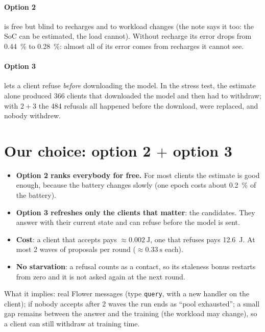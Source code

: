 \documentclass[11pt,a4paper]{article}
\begin{document}
\paragraph{Option 2} is free but blind to recharges and to workload changes
(the note says it too: the SoC can be estimated, the load cannot). Without
recharge its error drops from \SI{0.44}{\percent} to \SI{0.28}{\percent}: almost
all of its error comes from recharges it cannot see.

\paragraph{Option 3} lets a client refuse \emph{before} downloading the model.
In the stress test, the estimate alone produced 366 clients that downloaded the
model and then had to withdraw; with $2+3$ the 484 refusals all happened before
the download, were replaced, and nobody withdrew.

\section{Our choice: option 2 $+$ option 3}

\begin{itemize}
  \item \textbf{Option 2 ranks everybody for free.} For most clients the
        estimate is good enough, because the battery changes slowly (one
        epoch costs about \SI{0.2}{\percent} of the battery).
  \item \textbf{Option 3 refreshes only the clients that matter}: the
        candidates. They answer with their current state and can refuse
        before the model is sent.
  \item \textbf{Cost}: a client that accepts pays $\approx\SI{0.002}{\joule}$, one
        that refuses pays \SI{12.6}{\joule}. At most 2 waves of proposals per
        round ($\approx\SI{0.33}{\second}$ each).
  \item \textbf{No starvation}: a refusal counts as a contact, so its
        staleness bonus restarts from zero and it is not asked again at the
        next round.
\end{itemize}

What it implies: real Flower messages (type \texttt{query}, with a new handler
on the client); if nobody accepts after 2 waves the run ends as \enquote{pool
exhausted}; a small gap remains between the answer and the training (the
workload may change), so a client can still withdraw at training time.
\end{document}

